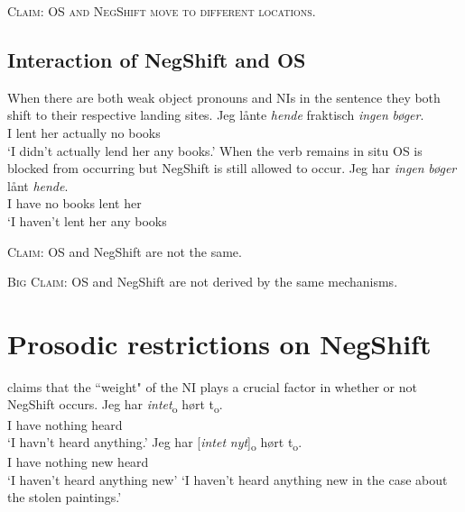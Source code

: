 \documentclass[12pt, letterpaper]{article}
\begin{document}
\begin{tcolorbox}[width=\linewidth]
\textsc{Claim: OS and NegShift move to different locations.}
\end{tcolorbox}
\subsection{Interaction of NegShift and OS} \label{sec:NEG-OS}
\ea When there are both weak object pronouns and NIs in the sentence they both shift to their respective landing sites. 
	\ea
	\label{ex:NegOS}
	\gll Jeg lånte \textit{hende} fraktisch \textit{ingen} \textit{bøger}.\\
	I lent her actually no books\\
	\glt `I didn't actually lend her any books.'
	\z 
\ex When the verb remains in situ OS is blocked from occurring but NegShift is still allowed to occur. 
	\ea 
	\gll Jeg har \emph{ingen} \emph{bøger} lånt \emph{hende}.\\
	I have no books lent her\\
	\glt `I haven't lent her any books
	\z
\z

\begin{tcolorbox}[width=\linewidth]
\textsc{Claim:} OS and NegShift are not the same.

\textsc{Big Claim:} OS and NegShift are not derived by the same mechanisms. 
\end{tcolorbox}
\section{Prosodic restrictions on NegShift} \label{sec:PROSODY}

\ea \citet[65f]{christensenInterfacesNegationSyntax2005} claims that the ``weight" of the NI plays a crucial factor in whether or not NegShift occurs. 
	\ea 
	\gll Jeg har \textit{intet}\textsubscript{o} hørt t\textsubscript{o}.\\
	I have nothing heard\\
	\glt  `I havn't heard anything.'
	\ex 
	\gll Jeg har [\textit{intet} \textit{nyt}]\textsubscript{o} hørt t\textsubscript{o}.\\
	I have nothing new heard\\
	\glt `I haven't heard anything new'
	\glt `I haven't heard anything new in the case about the stolen paintings.'
	\z
\end{document}
